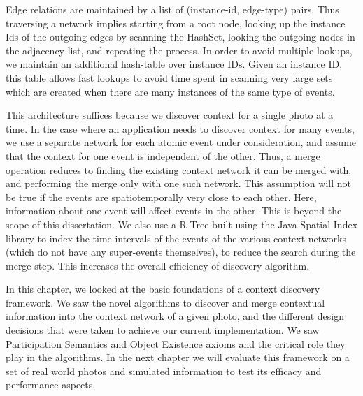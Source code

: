 Edge relations are maintained by a list of (instance-id, edge-type) pairs. Thus traversing a network implies starting from a root node, looking up the instance Ids of the outgoing edges by scanning the HashSet, looking the outgoing nodes in the adjacency list, and repeating the process. In order to avoid multiple lookups, we maintain an additional hash-table over instance IDs. Given an instance ID, this table allows fast lookups to avoid time spent in scanning very large sets which are created when there are many instances of the same type of events.

This architecture suffices because we discover context for a single photo at a time. In the case where an application needs to discover context for many events, we use a separate network for each atomic event under consideration, and assume that the context for one event is independent of the other. Thus, a merge operation reduces to finding the existing context network it can be merged with, and performing the merge only with one such network. This assumption will not be true if the events are spatiotemporally very close to each other. Here, information about one event will affect events in the other. This is beyond the scope of this dissertation. We also use a R-Tree built using the Java Spatial Index library to index the time intervals of the events of the various context networks (which do not have any super-events themselves), to reduce the search during the merge step. This increases the overall efficiency of discovery algorithm.

In this chapter, we looked at the basic foundations of a context discovery framework. We saw the novel algorithms to discover and merge contextual information into the context network of a given photo, and the different design decisions that were taken to achieve our current implementation. We saw Participation Semantics and Object Existence axioms and the critical role they play in the algorithms. In the next chapter we will evaluate this framework on a set of real world photos and simulated information to test its efficacy and performance aspects.